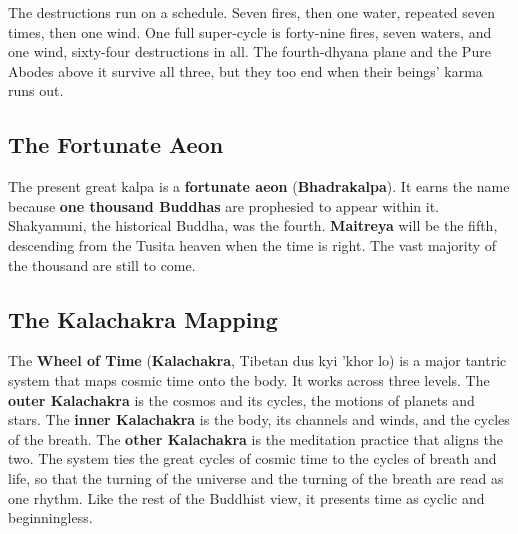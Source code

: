 The destructions run on a schedule. Seven fires, then one water, repeated seven times, then one wind. One full super-cycle is forty-nine fires, seven waters, and one wind, sixty-four destructions in all. The fourth-dhyana plane and the Pure Abodes above it survive all three, but they too end when their beings' karma runs out.

\subsection{The Fortunate Aeon}

The present great kalpa is a \textbf{fortunate aeon} (\textbf{Bhadrakalpa}). It earns the name because \textbf{one thousand Buddhas} are prophesied to appear within it. Shakyamuni, the historical Buddha, was the fourth. \textbf{Maitreya} will be the fifth, descending from the Tusita heaven when the time is right. The vast majority of the thousand are still to come.

\subsection{The Kalachakra Mapping}

The \textbf{Wheel of Time} (\textbf{Kalachakra}, Tibetan dus kyi 'khor lo) is a major tantric system that maps cosmic time onto the body. It works across three levels. The \textbf{outer Kalachakra} is the cosmos and its cycles, the motions of planets and stars. The \textbf{inner Kalachakra} is the body, its channels and winds, and the cycles of the breath. The \textbf{other Kalachakra} is the meditation practice that aligns the two. The system ties the great cycles of cosmic time to the cycles of breath and life, so that the turning of the universe and the turning of the breath are read as one rhythm. Like the rest of the Buddhist view, it presents time as cyclic and beginningless.
